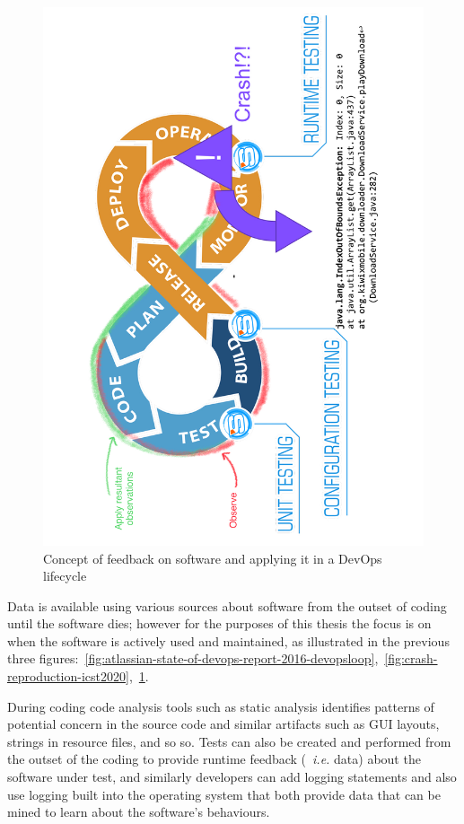 \begin{figure}
    \includegraphics[width=\linewidth]{images/icst-2020/annotated-crash-reproduction.pdf}
    \caption[Concept of applying feedback on software in DevOps]{Concept of feedback on software and applying it in a DevOps lifecycle}
    \label{fig:oberve-and-apply-devops-loop}
\end{figure}

Data is available using various sources about software from the outset of coding until the software dies; however for the purposes of this thesis the focus is on when the software is actively used and maintained, as illustrated in the previous three figures:~\ref{fig:atlassian-state-of-devops-report-2016-devopsloop},~\ref{fig:crash-reproduction-icst2020},~\ref{fig:oberve-and-apply-devops-loop}. 

During coding code analysis tools such as static analysis identifies patterns of potential concern in the source code and similar artifacts such as GUI layouts, strings in resource files, and so so. Tests can also be created and performed from the outset of the coding to provide runtime feedback (~\emph{i.e.} data) about the software under test, and similarly developers can add logging statements and also use logging built into the operating system that both provide data that can be mined to learn about the software's behaviours.

